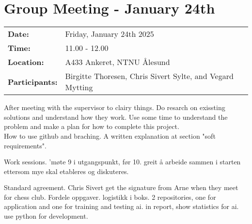 \section{Group Meeting - January 24th}
\begin{tabular}{ll}
    \textbf{Date:} & Friday, January 24th 2025 \\
    \textbf{Time:} & 11.00 - 12.00\\
    \textbf{Location:} & A433 Ankeret, NTNU Ålesund \\
    \textbf{Participants:} & Birgitte Thoresen, Chris Sivert Sylte, and Vegard Mytting\\
\end{tabular}

\vspace{0.5cm}

After meeting with the supervisor to clairy things. Do resarch on exissting solutions and understand how they work. Use some time to understand the problem and make a plan for how to complete this project. \\

How to use github and braching. A written explanation at section "soft requirements". 

Work sessions. 'møte 9 i utgangspunkt, før 10. greit å arbeide sammen i starten ettersom mye skal etableres og diskuteres. 


Standard agreement. Chris Sivert get the signature from Arne when they meet for chess club. Fordele oppgaver. logistikk i boks. 2 repositories, one for application and one for training and testing ai. in report, show statistics for ai. use python for development. 
